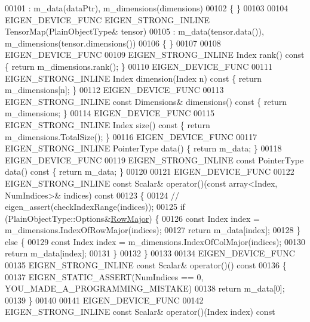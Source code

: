 \begin{DoxyCode}
00101       : m\_data(dataPtr), m\_dimensions(dimensions)
00102     \{ \}
00103 
00104     EIGEN\_DEVICE\_FUNC EIGEN\_STRONG\_INLINE TensorMap(PlainObjectType& tensor)
00105       : m\_data(tensor.data()), m\_dimensions(tensor.dimensions())
00106     \{ \}
00107 
00108     EIGEN\_DEVICE\_FUNC
00109     EIGEN\_STRONG\_INLINE Index rank()\textcolor{keyword}{ const }\{ \textcolor{keywordflow}{return} m\_dimensions.rank(); \}
00110     EIGEN\_DEVICE\_FUNC
00111     EIGEN\_STRONG\_INLINE Index dimension(Index n)\textcolor{keyword}{ const }\{ \textcolor{keywordflow}{return} m\_dimensions[n]; \}
00112     EIGEN\_DEVICE\_FUNC
00113     EIGEN\_STRONG\_INLINE \textcolor{keyword}{const} Dimensions& dimensions()\textcolor{keyword}{ const }\{ \textcolor{keywordflow}{return} m\_dimensions; \}
00114     EIGEN\_DEVICE\_FUNC
00115     EIGEN\_STRONG\_INLINE Index size()\textcolor{keyword}{ const }\{ \textcolor{keywordflow}{return} m\_dimensions.TotalSize(); \}
00116     EIGEN\_DEVICE\_FUNC
00117     EIGEN\_STRONG\_INLINE PointerType data() \{ \textcolor{keywordflow}{return} m\_data; \}
00118     EIGEN\_DEVICE\_FUNC
00119     EIGEN\_STRONG\_INLINE \textcolor{keyword}{const} PointerType data()\textcolor{keyword}{ const }\{ \textcolor{keywordflow}{return} m\_data; \}
00120 
00121     EIGEN\_DEVICE\_FUNC
00122     EIGEN\_STRONG\_INLINE \textcolor{keyword}{const} Scalar& operator()(\textcolor{keyword}{const} array<Index, NumIndices>& indices)\textcolor{keyword}{ const}
00123 \textcolor{keyword}{    }\{
00124       \textcolor{comment}{//      eigen\_assert(checkIndexRange(indices));}
00125       \textcolor{keywordflow}{if} (PlainObjectType::Options&\hyperlink{group__enums_ggaacded1a18ae58b0f554751f6cdf9eb13acfcde9cd8677c5f7caf6bd603666aae3}{RowMajor}) \{
00126         \textcolor{keyword}{const} Index index = m\_dimensions.IndexOfRowMajor(indices);
00127         \textcolor{keywordflow}{return} m\_data[index];
00128       \} \textcolor{keywordflow}{else} \{
00129         \textcolor{keyword}{const} Index index = m\_dimensions.IndexOfColMajor(indices);
00130         \textcolor{keywordflow}{return} m\_data[index];
00131       \}
00132     \}
00133 
00134     EIGEN\_DEVICE\_FUNC
00135     EIGEN\_STRONG\_INLINE \textcolor{keyword}{const} Scalar& operator()()\textcolor{keyword}{ const}
00136 \textcolor{keyword}{    }\{
00137       EIGEN\_STATIC\_ASSERT(NumIndices == 0, YOU\_MADE\_A\_PROGRAMMING\_MISTAKE)
00138       \textcolor{keywordflow}{return} m\_data[0];
00139     \}
00140 
00141     EIGEN\_DEVICE\_FUNC
00142     EIGEN\_STRONG\_INLINE \textcolor{keyword}{const} Scalar& operator()(Index index)\textcolor{keyword}{ const}

\end{DoxyCode}
